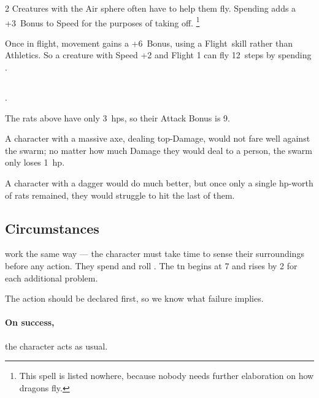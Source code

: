 \begin{multicols}{2}
Creatures with the Air \gls{sphere} often have  to help them fly.
Spending  adds a +3~Bonus to Speed for the purposes of taking off.%
\footnote{This \gls{spell} is listed nowhere, because nobody needs further elaboration on how \glspl{dragon} fly.}

Once in flight, movement gains a +6~Bonus, using a Flight~\gls{skill} rather than Athletics.
So a creature with Speed +2 and Flight 1 can fly 12~\glspl{step} by spending .

\subsection{}
.


\vspace{2\baselineskip}

\begin{exampletext}
  The rats above have only 3~\glspl{hp}, so their Attack Bonus is 9.

  A character with a massive axe, dealing top-Damage, would not fare well against the swarm; no matter how much Damage they would deal to a person, the swarm only loses 1~\gls{hp}.

  A character with a dagger would do much better, but once only a single \gls{hp}-worth of rats remained, they would struggle to hit the last of them.
\end{exampletext}

\resumecontents[Manoeuvres]

\subsection{Circumstances}

work the same way --- the character must take time to sense their surroundings before any \gls{action}.
\label{darkness}
They spend  and roll .
The \gls{tn} begins at 7 and rises by 2 for each additional problem.

The \gls{action} should be declared first, so we know what failure implies.

\paragraph{On success,}
the character acts as usual.


\end{multicols}
